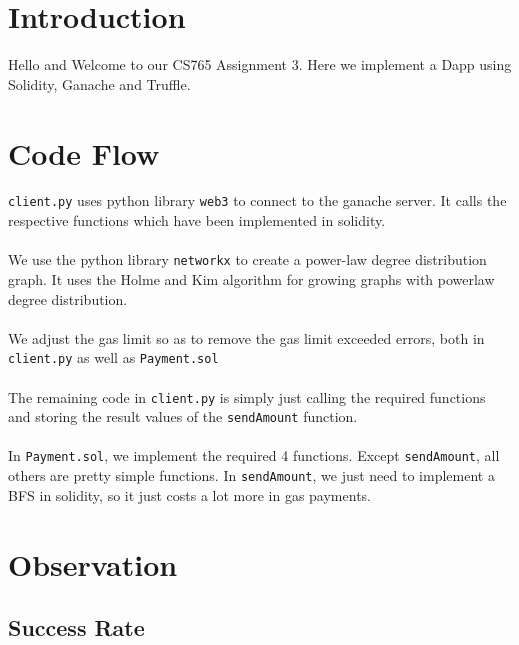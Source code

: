 \documentclass[a4paper,14pt]{article}
\begin{document}

\date{Spring 2023}
\maketitle

\justifying


\justifying

\section*{Introduction}

Hello and Welcome to our CS765 Assignment 3. Here we implement a Dapp using Solidity, Ganache and Truffle.

\section{Code Flow}

\verb|client.py| uses python library \verb|web3| to connect to the ganache server. It calls the respective functions which have been implemented in solidity.\\\\
We use the python library \verb|networkx| to create a power-law degree distribution graph. It uses the Holme and Kim algorithm for growing graphs with powerlaw degree distribution.\\\\
We adjust the gas limit so as to remove the gas limit exceeded errors, both in \verb|client.py| as well as \verb|Payment.sol|\\\\
The remaining code in \verb|client.py| is simply just calling the required functions and storing the result values of the \verb|sendAmount| function.\\\\
In \verb|Payment.sol|, we implement the required 4 functions. Except \verb|sendAmount|, all others are pretty simple functions. In \verb|sendAmount|, we just need to implement a BFS in solidity, so it just costs a lot more in gas payments.



\section{Observation}

\subsection{Success Rate}
\end{document}
